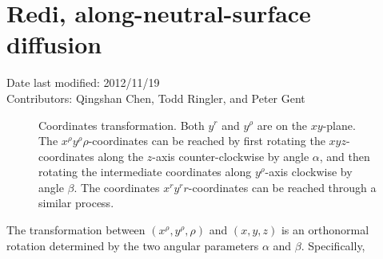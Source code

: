 \documentclass[12pt]{report}
\begin{document}
\section{Redi, along-neutral-surface diffusion}\label{sec:redi-isopycn-diff} 
Date last modified: 2012/11/19 \\
Contributors: Qingshan Chen, Todd Ringler, and Peter Gent\\


\begin{figure}[h]
  \centering
  \caption{Coordinates transformation. Both $y^r$ and $y^\rho$ are on
    the $xy$-plane. The $x^\rho y^\rho\rho$-coordinates can be reached
  by first rotating the $xyz$-coordinates along the $z$-axis
  counter-clockwise by angle $\alpha$, and then rotating the
  intermediate coordinates along $y^\rho$-axis clockwise by angle
  $\beta$. The coordinates $x^ry^rr$-coordinates can be reached
  through a similar process. }
\end{figure}
The transformation between $(x^\rho, y^\rho, \rho)$ and $(x, y, z)$ is
an orthonormal rotation determined by the two angular parameters
$\alpha$ and $\beta$. Specifically, 
\end{document}
